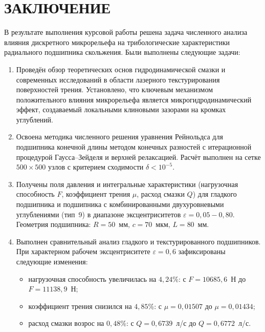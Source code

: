 \section*{ЗАКЛЮЧЕНИЕ}
{}

В результате выполнения курсовой работы решена задача численного анализа влияния дискретного микрорельефа на трибологические характеристики радиального подшипника скольжения. Были выполнены следующие задачи:

\begin{enumerate}
    \item Проведён обзор теоретических основ гидродинамической смазки и современных исследований в области лазерного текстурирования поверхностей трения. Установлено, что ключевым механизмом положительного влияния микрорельефа является микрогидродинамический эффект, создаваемый локальными клиновыми зазорами на кромках углублений.

    \item Освоена методика численного решения уравнения Рейнольдса для подшипника конечной длины методом конечных разностей с итерационной процедурой Гаусса--Зейделя и верхней релаксацией. Расчёт выполнен на сетке $500 \times 500$ узлов с критерием сходимости $\delta < 10^{-5}$.

    \item Получены поля давления и интегральные характеристики (нагрузочная способность $F$, коэффициент трения $\mu$, расход смазки $Q$) для гладкого подшипника и подшипника с комбинированными двухуровневыми углублениями (тип~9) в диапазоне эксцентриситетов $\varepsilon = 0{,}05 - 0{,}80$. Геометрия подшипника: $R = 50$~мм, $c = 70$~мкм, $L = 80$~мм.

    \item Выполнен сравнительный анализ гладкого и текстурированного подшипников. При характерном рабочем эксцентриситете $\varepsilon = 0{,}6$ зафиксированы следующие изменения:
    \begin{itemize}
        \item нагрузочная способность увеличилась на $4{,}24$\%: с $F = 10685{,}6$~Н до $F = 11138{,}9$~Н;
        \item коэффициент трения снизился на $4{,}85$\%: с $\mu = 0{,}01507$ до $\mu = 0{,}01434$;
        \item расход смазки возрос на $0{,}48$\%: с $Q = 0{,}6739$~л/с до $Q = 0{,}6772$~л/с.
    \end{itemize}
\end{enumerate}

